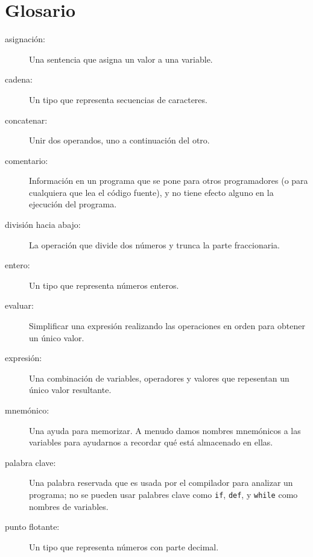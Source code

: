 

\section{Glosario}

\begin{description}

\item[asignación:]  Una sentencia que asigna un valor a una variable.

\item[cadena:] Un tipo que representa secuencias de caracteres.

\item[concatenar:]  Unir dos operandos, uno a continuación del otro.

\item[comentario:]  Información en un programa que se pone para otros
programadores (o para cualquiera que lea el código fuente), y no tiene efecto alguno
en la ejecución del programa.

\item[división hacia abajo:] La operación que divide dos números y trunca la
parte fraccionaria.

\item[entero:] Un tipo que representa números enteros.

\item[evaluar:]  Simplificar una expresión realizando las operaciones
en orden para obtener un único valor.

\item[expresión:]  Una combinación de variables, operadores y valores que
repesentan un único valor resultante.

\item[mnemónico:] Una ayuda para memorizar. A menudo damos nombres mnemónicos a las variables
para ayudarnos a recordar qué está almacenado en ellas.

\item[palabra clave:]  Una palabra reservada que es usada por el compilador para analizar un
programa; no se pueden usar palabres clave como {\tt if}, {\tt  def}, y {\tt while} como
nombres de variables.

\item[punto flotante:] Un tipo que representa números con parte
decimal.


\end{description}
